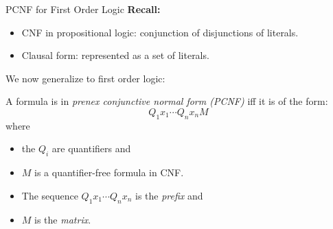 \begin{wideslide}[bm=,toc=]{PCNF for First Order Logic}
{\bf Recall:}
\begin{itemize}
\item CNF in propositional logic: conjunction of disjunctions of literals.
\item Clausal form: represented as a set of literals.
\end{itemize}
\pause
We now generalize to first order logic:
\begin{defn}{9.9}
A formula is in \emph{prenex conjunctive normal form (PCNF)} iff it is of the
form:
\pause
\[
  Q_1x_1\cdots Q_n x_n M
  \]
\pause
  where 
  \begin{itemize}
  \item<5-> the $Q_i$ are quantifiers and 
  \item<6-> $M$ is a quantifier-free formula in CNF.
  \item<7-> The sequence $Q_1x_1 \cdots Q_n x_n$ is the \emph{prefix} and 
  \item<8-> $M$ is the \emph{matrix}.
  \end{itemize}
\end{defn}

\end{wideslide}


